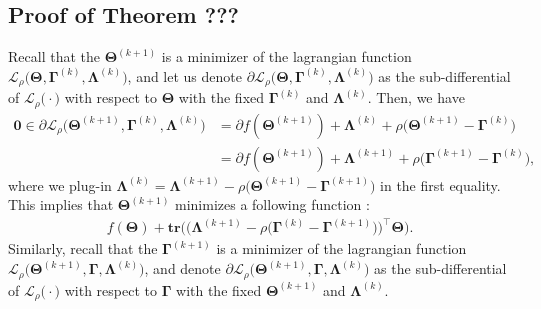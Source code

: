 \documentclass[alpha-refs]{wiley-article}
\begin{document}
\subsection{Proof of Theorem ???}

Recall that the $\boldsymbol{\Theta}^{(k+1)}$ is a minimizer of the lagrangian function $\mathcal{L}_{\rho}\big(\boldsymbol{\Theta},\boldsymbol{\Gamma}^{(k)},\boldsymbol{\Lambda}^{(k)} \big)$, and let us denote $\partial\mathcal{L}_{\rho}\big(\boldsymbol{\Theta},\boldsymbol{\Gamma}^{(k)},\boldsymbol{\Lambda}^{(k)} \big)$ as the sub-differential of  $\mathcal{L}_{\rho}\big(\cdot\big)$ with respect to $\boldsymbol{\Theta}$ with the fixed $\boldsymbol{\Gamma}^{(k)}$ and $\boldsymbol{\Lambda}^{(k)}$.
Then, we have
\begin{align*}
    \boldsymbol{0} \in
    \partial\mathcal{L}_{\rho}\big(\boldsymbol{\Theta}^{(k+1)},\boldsymbol{\Gamma}^{(k)},\boldsymbol{\Lambda}^{(k)} \big)
    &= \partial f(\boldsymbol{\Theta}^{(k+1)}) + \boldsymbol{\Lambda}^{(k)} + \rho\big( \boldsymbol{\Theta}^{(k+1)} - \boldsymbol{\Gamma}^{(k)} \big) \\
    &= \partial f(\boldsymbol{\Theta}^{(k+1)}) + \boldsymbol{\Lambda}^{(k+1)} + \rho\big( \boldsymbol{\Gamma}^{(k+1)} - \boldsymbol{\Gamma}^{(k)} \big),
\end{align*}
where we plug-in $\boldsymbol{\Lambda}^{(k)}=\boldsymbol{\Lambda}^{(k+1)}-\rho\big( \boldsymbol{\Theta}^{(k+1)} - \boldsymbol{\Gamma}^{(k+1)} \big)$ in the first equality.
This implies that $\boldsymbol{\Theta}^{(k+1)}$ minimizes a following function :
\begin{align} \label{f}
    f(\boldsymbol{\Theta}) + \textbf{tr} \big( \big( \boldsymbol{\Lambda}^{(k+1)} - \rho\big( \boldsymbol{\Gamma}^{(k)} - \boldsymbol{\Gamma}^{(k+1)} \big) \big) ^{\top} \boldsymbol{\Theta} \big).
\end{align}
Similarly, recall that the $\boldsymbol{\Gamma}^{(k+1)}$ is a minimizer of the lagrangian function $\mathcal{L}_{\rho}\big(\boldsymbol{\Theta}^{(k+1)},\boldsymbol{\Gamma},\boldsymbol{\Lambda}^{(k)} \big)$, and denote $\partial\mathcal{L}_{\rho}\big(\boldsymbol{\Theta}^{(k+1)},\boldsymbol{\Gamma},\boldsymbol{\Lambda}^{(k)}\big)$ as the sub-differential of  $\mathcal{L}_{\rho}\big(\cdot\big)$ with respect to $\boldsymbol{\Gamma}$ with the fixed $\boldsymbol{\Theta}^{(k+1)}$ and $\boldsymbol{\Lambda}^{(k)}$.
\end{document}
